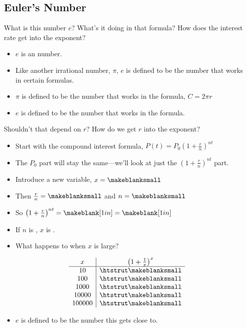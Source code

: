 \subsection{Euler's Number} 
What is this number $e$? What's it doing in that formula? How does the interest rate get into the exponent?
\begin{itemize}
\item $e$ is an \makeblank[1in] number.
\item Like another irrational number, $\pi$, $e$ is defined to be the number that works in certain formulas.
\item $\pi$ is defined to be the number that works in the \makeblank[1.5in] formula, $C=2\pi r$
\item $e$ is defined to be the number that works in the \makeblank formula.
\end{itemize}
Shouldn't that depend on $r$? How do we get $r$ into the exponent?
\begin{itemize}
\item Start with the compound interest formula, $P(t)=P_0\left(1+\frac{r}{n}\right)^{nt}$
\item The $P_0$ part will stay the same---we'll look at just the $\left(1+\frac{r}{n}\right)^{nt}$ part.
\item Introduce a new variable, $x=\makeblanksmall$
\item Then $\frac{r}{n}=\makeblanksmall$ and $n=\makeblanksmall$
\item So $\left(1+\frac{r}{n}\right)^{nt}=\makeblank[1in]=\makeblank[1in]$
\item If $n$ is \makeblank[1in], $x$ is \makeblank[1in].
\item What happens to \makeblank when $x$ is large?
\end{itemize}
\[
\begin{array}{c|c}
     x&\left(1+\frac{1}{x}\right)^x\\\hline
    10&\htstrut\makeblanksmall\\
   100&\htstrut\makeblanksmall\\
  1000&\htstrut\makeblanksmall\\
 10000&\htstrut\makeblanksmall\\
100000&\htstrut\makeblanksmall
\end{array}
\]
\begin{itemize}
\item $e$ is defined to be the number this gets close to.
\end{itemize}